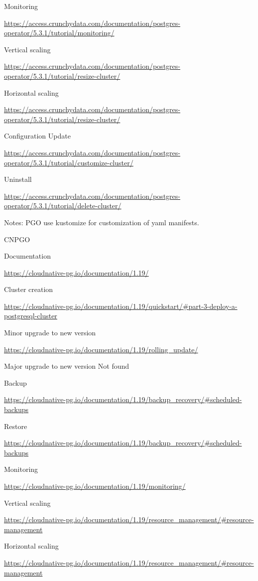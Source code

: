 Monitoring

\url{https://access.crunchydata.com/documentation/postgres-operator/5.3.1/tutorial/monitoring/}

Vertical scaling

\url{https://access.crunchydata.com/documentation/postgres-operator/5.3.1/tutorial/resize-cluster/}

Horizontal scaling

\url{https://access.crunchydata.com/documentation/postgres-operator/5.3.1/tutorial/resize-cluster/}

Configuration Update

\url{https://access.crunchydata.com/documentation/postgres-operator/5.3.1/tutorial/customize-cluster/}

Uninstall

\url{https://access.crunchydata.com/documentation/postgres-operator/5.3.1/tutorial/delete-cluster/}

Notes: PGO use kustomize for customization of yaml manifests.

CNPGO

Documentation

\url{https://cloudnative-pg.io/documentation/1.19/}

Cluster creation

\url{https://cloudnative-pg.io/documentation/1.19/quickstart/#part-3-deploy-a-postgresql-cluster}

Minor upgrade to new version

\url{https://cloudnative-pg.io/documentation/1.19/rolling_update/}

Major upgrade to new version
Not found

Backup

\url{https://cloudnative-pg.io/documentation/1.19/backup_recovery/#scheduled-backups}

Restore

\url{https://cloudnative-pg.io/documentation/1.19/backup_recovery/#scheduled-backups}

Monitoring

\url{https://cloudnative-pg.io/documentation/1.19/monitoring/}

Vertical scaling

\url{https://cloudnative-pg.io/documentation/1.19/resource_management/#resource-management}

Horizontal scaling

\url{https://cloudnative-pg.io/documentation/1.19/resource_management/#resource-management}


